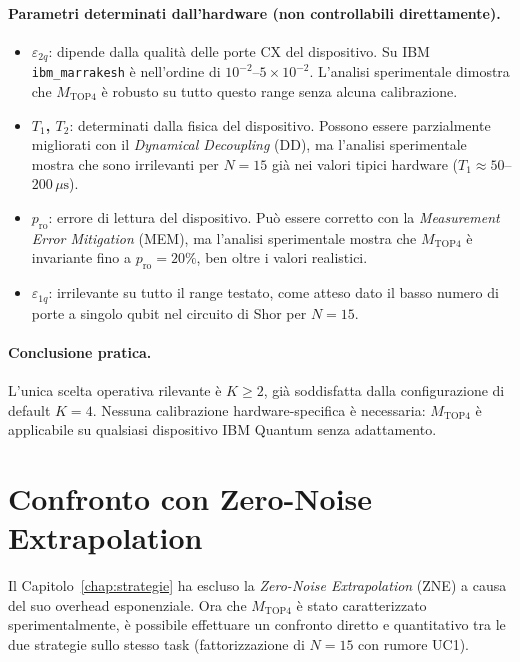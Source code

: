 \begin{onehalfspace}
\paragraph{Parametri determinati dall'hardware (non controllabili direttamente).}
\begin{itemize}
    \item \textbf{$\varepsilon_{2q}$}: dipende dalla qualità delle porte CX del dispositivo. Su IBM \texttt{ibm\_marrakesh} è nell'ordine di $10^{-2}$--$5\times10^{-2}$. L'analisi sperimentale dimostra che $M_{\text{TOP4}}$ è robusto su tutto questo range senza alcuna calibrazione.
    \item \textbf{$T_1$, $T_2$}: determinati dalla fisica del dispositivo. Possono essere parzialmente migliorati con il \textit{Dynamical Decoupling} (DD), ma l'analisi sperimentale mostra che sono irrilevanti per $N=15$ già nei valori tipici hardware ($T_1 \approx 50$--$200\,\mu\text{s}$).
    \item \textbf{$p_{\text{ro}}$}: errore di lettura del dispositivo. Può essere corretto con la \textit{Measurement Error Mitigation} (MEM), ma l'analisi sperimentale mostra che $M_{\text{TOP4}}$ è invariante fino a $p_{\text{ro}}=20\%$, ben oltre i valori realistici.
    \item \textbf{$\varepsilon_{1q}$}: irrilevante su tutto il range testato, come atteso dato il basso numero di porte a singolo qubit nel circuito di Shor per $N=15$.
\end{itemize}

\paragraph{Conclusione pratica.}
L'unica scelta operativa rilevante è $K \geq 2$, già soddisfatta dalla configurazione di default $K=4$. Nessuna calibrazione hardware-specifica è necessaria: $M_{\text{TOP4}}$ è applicabile su qualsiasi dispositivo IBM Quantum senza adattamento.

\section{Confronto con Zero-Noise Extrapolation}
\label{sec:confronto_zne}

Il Capitolo~\ref{chap:strategie} ha escluso la \textit{Zero-Noise Extrapolation} (\ac{ZNE}) a causa del suo overhead esponenziale. Ora che $M_{\text{TOP4}}$ è stato caratterizzato sperimentalmente, è possibile effettuare un confronto diretto e quantitativo tra le due strategie sullo stesso task (fattorizzazione di $N=15$ con rumore UC1).


\end{onehalfspace}
